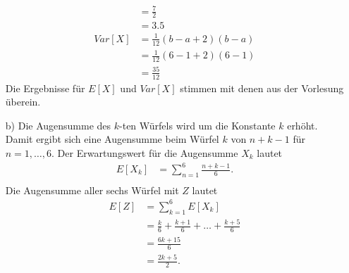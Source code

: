 \begin{enumerate}
\begin{equation*}
\begin{split}
								&= \frac{7}{2}\\
								&= 3.5\\
			Var[X]				&= \frac{1}{12}(b-a+2)(b-a)\\
								&= \frac{1}{12}(6-1+2)(6-1)\\
								&= \frac{35}{12}
		\end{split}
	\end{equation*}
	Die Ergebnisse für $E[X]$ und $Var[X]$ stimmen mit denen aus der Vorlesung überein. 
\item[b)] Die Augensumme des $k$-ten Würfels wird um die Konstante $k$ erhöht. Damit ergibt sich eine Augensumme beim Würfel $k$ von $n+k-1$ für $n={1,\dots,6}$. Der Erwartungswert für die Augensumme $X_k$ lautet
	\begin{equation*}
		\begin{split}
			E[X_k]				&= \sum_{n=1}^{6} \frac{n+k-1}{6}.\\
		\end{split}
	\end{equation*}
Die Augensumme aller sechs Würfel mit $Z$ lautet
	\begin{equation*}
		\begin{split}
			E[Z]				&= \sum_{k=1}^{6} E[X_k]\\
								&= \frac{k}{6} + \frac{k+1}{6} + \dots + \frac{k+5}{6}\\
								&= \frac{6k+15}{6}\\
								&= \frac{2k+5}{2}.
		\end{split}
	\end{equation*}
\end{enumerate}